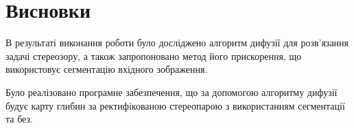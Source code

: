 \chapter*{Висновки}

В результаті виконання роботи було досліджено
алгоритм дифузії для розв'язання задачі стереозору,
а також запропоновано метод його прискорення,
що використовує сегментацію вхідного зображення.

Було реалізовано програмне забезпечення,
що за допомогою алгоритму дифузії будує карту глибин
за ректифікованою стереопарою з використанням сегментації та без.

